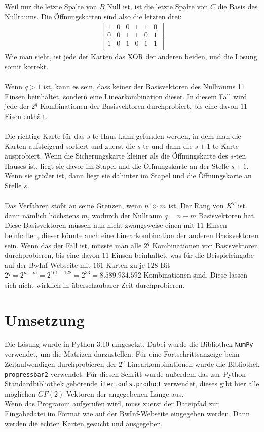 \documentclass[a4paper,10pt,ngerman]{scrartcl}
\begin{document}
Weil nur die letzte Spalte von $B$ Null ist, ist die letzte Spalte von $C$ die Basis des Nullraums. Die Öffnungskarten sind also die letzten drei:
\begin{align*}
\left[\begin{array}{cccccc}
1 & 0 & 0 & 1 & 1 & 0 \\
0 & 0 & 1 & 1 & 0 & 1 \\
1 & 0 & 1 & 0 & 1 & 1 \\
\end{array}\right]
\end{align*}
Wie man sieht, ist jede der Karten das XOR der anderen beiden, und die Lösung somit korrekt. \\\\
Wenn $q>1$ ist, kann es sein, dass keiner der Basisvektoren des Nullraums 11 Einsen beinhaltet, sondern eine Linearkombination dieser. In diesem Fall wird jede der $2^q$ Kombinationen der Basisvektoren durchprobiert, bis eine davon $11$ Eisen enthält.\\\\
Die richtige Karte für das $s$-te Haus kann gefunden werden, in dem man die Karten aufsteigend sortiert und zuerst die $s$-te und dann die $s+1$-te Karte ausprobiert. Wenn die Sicherungskarte kleiner als die Öffnungskarte des $s$-ten Hauses ist, liegt sie davor im Stapel und die Öffnungskarte an der Stelle $s+1$. Wenn sie größer ist, dann liegt sie dahinter im Stapel und die Öffnungskarte an Stelle $s$.\\
\\
Das Verfahren stößt an seine Grenzen, wenn $n \gg m$ ist. Der Rang von $K^T$ ist dann nämlich höchstens $m$, wodurch der Nullraum $q=n-m$ Basisvektoren hat. Diese Basisvektoren müssen nun nicht zwangsweise einen mit 11 Einsen beinhalten, dieser könnte auch eine Linearkombination der anderen Basisvektoren sein. Wenn das der Fall ist, müsste man alle $2^q$ Kombinationen von Basisvektoren durchprobieren, bis eine davon $11$ Einsen beinhaltet, was für die Beispieleingabe auf der BwInf-Webseite mit $161$ Karten zu je $128$ Bit $2^q=2^{n-m}=2^{161-128}=2^{33}=8.589.934.592$ Kombinationen sind. Diese lassen sich nicht wirklich in überschaubarer Zeit durchprobieren.
\section{Umsetzung}
Die Lösung wurde in Python 3.10 umgesetzt. Dabei wurde die Bibliothek \lstinline|NumPy| verwendet, um die Matrizen darzustellen. Für eine Fortschrittsanzeige beim Zeitaufwendigen durchprobieren der $2^q$ Linearkombinationen wurde die Bibliothek \lstinline|progressbar2| verwendet. Für diesen Schritt wurde außerdem das zur Python-Standardbibliothek gehörende \lstinline|itertools.product| verwendet, dieses gibt hier alle möglichen $GF(2)$-Vektoren der angegebenen Länge aus.\\ Wenn das Programm aufgerufen wird, muss zuerst der Dateipfad zur Eingabedatei im Format wie auf der BwInf-Webseite eingegeben werden. Dann werden die echten Karten gesucht und ausgegeben. 
\end{document}
